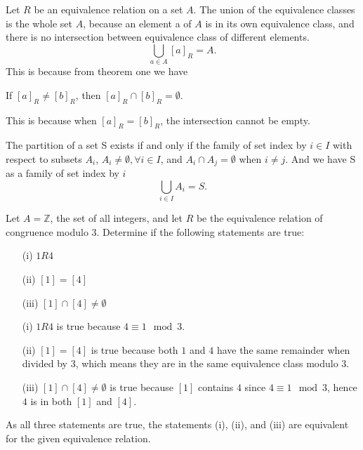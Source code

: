 Let $R$ be an equivalence relation on a set $A$. The union of the equivalence classes is the whole set $A$, because an element a of $A$ is in its own equivalence class, and there is no intersection between equivalence class of different elements.
\begin{equation} 
	\bigcup_{a\in A}[a]_R=A.
\end{equation}
This is because from theorem one we have
\begin{lemma}
	If $[a]_R \neq [b]_R$, then $[a]_R\cap[b]_R=\emptyset.$
\end{lemma}
This is because when $[a]_R = [b]_R$, the intersection cannot be empty.
\begin{lemma}
	The partition of a set S exists if and only if the family of set index by $i \in I$ with respect to subsets $A_i$, $A_i \neq \emptyset, \forall i \in I$, and $A_i\cap A_j = \emptyset$ when $i\neq j$.
	And we have S as a family of set index by $i$
	$$\bigcup_{i \in I}A_i = S.$$
\end{lemma}


\begin{example}
	Let \( A = \mathbb{Z} \), the set of all integers, and let \( R \) be the equivalence relation of congruence modulo \( 3 \). Determine if the following statements are true:
	\begin{enumerate}
		\item[(i)] \( 1R4 \)
		\item[(ii)] \( [1] = [4] \)
		\item[(iii)] \( [1] \cap [4] \neq \emptyset \)
	\end{enumerate}
\end{example}

\begin{solution}
	\begin{enumerate}
		\item[(i)] \( 1R4 \) is true because \( 4 \equiv 1 \mod 3 \).
		\item[(ii)] \( [1] = [4] \) is true because both \( 1 \) and \( 4 \) have the same remainder when divided by \( 3 \), which means they are in the same equivalence class modulo \( 3 \).
		\item[(iii)] \( [1] \cap [4] \neq \emptyset \) is true because \( [1] \) contains \( 4 \) since \( 4 \equiv 1 \mod 3 \), hence \( 4 \) is in both \( [1] \) and \( [4] \).
	\end{enumerate}
	As all three statements are true, the statements (i), (ii), and (iii) are equivalent for the given equivalence relation.
\end{solution}

